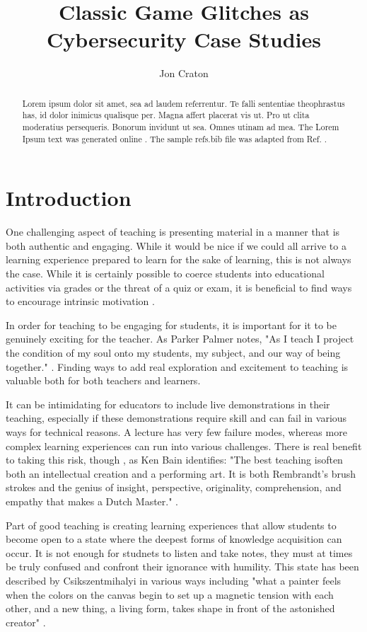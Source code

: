 \documentclass[letterpaper]{article}
\title{Classic Game Glitches as Cybersecurity Case Studies}
\author[1]{Jon Craton}
\affil[1]{Anderson University, Anderson, IN}
\date{} %
\begin{document}
\maketitle

\begin{abstract}
Lorem ipsum dolor sit amet, sea ad laudem referrentur. Te falli sententiae theophrastus has, id dolor inimicus qualisque per. Magna affert placerat vis ut. Pro ut clita moderatius persequeris. Bonorum invidunt ut sea. Omnes utinam ad mea. The Lorem Ipsum text was generated online \cite{loremipsum2025}.  The sample refs.bib file was adapted from Ref. \cite{overleafbibtex2025}.
\end{abstract}

\section{Introduction}
One challenging aspect of teaching is presenting material in a manner that is both authentic and engaging. While it would be nice if we could all arrive to a learning experience prepared to learn for the sake of learning, this is not always the case. While it is certainly possible to coerce students into educational activities via grades or the threat of a quiz or exam, it is beneficial to find ways to encourage intrinsic motivation \cite{deci2013intrinsic}.

In order for teaching to be engaging for students, it is important for it to be genuinely exciting for the teacher. As Parker Palmer notes, "As I teach I project the condition of my soul onto my students, my subject, and our way of being together." \cite{palmer2000courage}. Finding ways to add real exploration and excitement to teaching is valuable both for both teachers and learners.

It can be intimidating for educators to include live demonstrations in their teaching, especially if these demonstrations require skill and can fail in various ways for technical reasons. A lecture has very few failure modes, whereas more complex learning experiences can run into various challenges. There is real benefit to taking this risk, though , as Ken Bain identifies: "The best teaching isoften both an intellectual creation and a performing art. It is both Rembrandt’s brush strokes and the genius of insight, perspective, originality, comprehension, and empathy that makes a Dutch Master." \cite{bain2004best}.

Part of good teaching is creating learning experiences that allow students to become open to a state where the deepest forms of knowledge acquisition can occur. It is not enough for studnets to listen and take notes, they must at times be truly confused and confront their ignorance with humility. This state has been described by Csikszentmihalyi in various ways including  "what a painter feels when the colors on the canvas begin to set up a magnetic tension with each other, and a new thing, a living form, takes shape in front of the astonished creator" \cite{csikszentmihalyi1990flow}.
\end{document}
